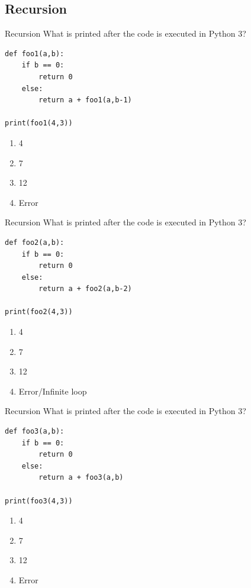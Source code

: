 \documentclass[9pt]{beamer}
\begin{document}
\subsection{Recursion}
\begin{frame}[fragile]{Recursion}
  What is printed after the code is executed in Python 3?
  \begin{lstlisting}
def foo1(a,b):
    if b == 0:
        return 0
    else:
        return a + foo1(a,b-1)

print(foo1(4,3))
  \end{lstlisting}

  \begin{enumerate}
    \item
      4
    \item
      7
    \item
      \alert<2>{12}
    \item
      Error
  \end{enumerate}
\end{frame}

\begin{frame}[fragile]{Recursion}
  What is printed after the code is executed in Python 3?

  \begin{lstlisting}
def foo2(a,b):
    if b == 0:
        return 0
    else:
        return a + foo2(a,b-2)

print(foo2(4,3))
  \end{lstlisting}

  \begin{enumerate}
    \item
      4
    \item
      7
    \item
      12
    \item
      \alert<2>{Error/Infinite loop}
  \end{enumerate}
\end{frame}

\begin{frame}[fragile]{Recursion}
  What is printed after the code is executed in Python 3?

  \begin{lstlisting}
def foo3(a,b):
    if b == 0:
        return 0
    else:
        return a + foo3(a,b)

print(foo3(4,3))
  \end{lstlisting}

  \begin{enumerate}
    \item
      4
    \item
      7
    \item
      12
    \item
      \alert<2>{Error}
  \end{enumerate}
\end{frame}
\end{document}
